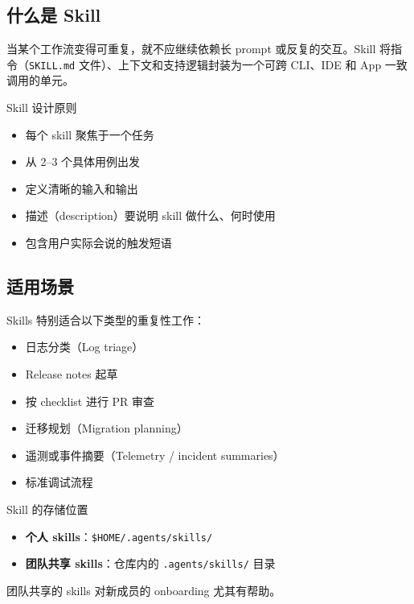 \documentclass[a4paper]{article}
\begin{document}
\subsection{什么是 Skill}

当某个工作流变得可重复，就不应继续依赖长 prompt 或反复的交互。Skill 将指令（\texttt{SKILL.md} 文件）、上下文和支持逻辑封装为一个可跨 CLI、IDE 和 App 一致调用的单元。

\begin{importantbox}{Skill 设计原则}
\begin{itemize}[nosep]
    \item 每个 skill 聚焦于一个任务
    \item 从 2--3 个具体用例出发
    \item 定义清晰的输入和输出
    \item 描述（description）要说明 skill 做什么、何时使用
    \item 包含用户实际会说的触发短语
\end{itemize}
\end{importantbox}

\subsection{适用场景}

Skills 特别适合以下类型的重复性工作：

\begin{itemize}
    \item 日志分类（Log triage）
    \item Release notes 起草
    \item 按 checklist 进行 PR 审查
    \item 迁移规划（Migration planning）
    \item 遥测或事件摘要（Telemetry / incident summaries）
    \item 标准调试流程
\end{itemize}

\begin{knowledgebox}{Skill 的存储位置}
\begin{itemize}[nosep]
    \item \textbf{个人 skills}：\texttt{\$HOME/.agents/skills/}
    \item \textbf{团队共享 skills}：仓库内的 \texttt{.agents/skills/} 目录
\end{itemize}
团队共享的 skills 对新成员的 onboarding 尤其有帮助。
\end{knowledgebox}
\end{document}
